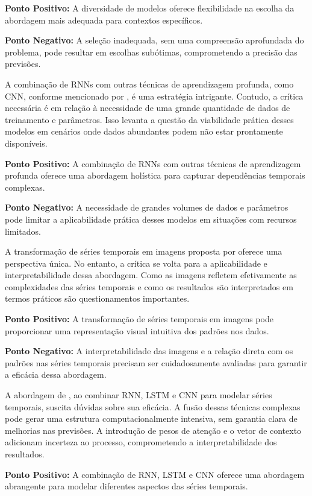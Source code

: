 \textbf{Ponto Positivo:} A diversidade de modelos oferece flexibilidade na escolha da abordagem mais adequada para contextos específicos.

\textbf{Ponto Negativo:} A seleção inadequada, sem uma compreensão aprofundada do problema, pode resultar em escolhas subótimas, comprometendo a precisão das previsões.

A combinação de RNNs com outras técnicas de aprendizagem profunda, como CNN, conforme mencionado por , é uma estratégia intrigante. Contudo, a crítica necessária é em relação à necessidade de uma grande quantidade de dados de treinamento e parâmetros. Isso levanta a questão da viabilidade prática desses modelos em cenários onde dados abundantes podem não estar prontamente disponíveis.

\textbf{Ponto Positivo:} A combinação de RNNs com outras técnicas de aprendizagem profunda oferece uma abordagem holística para capturar dependências temporais complexas.

\textbf{Ponto Negativo:} A necessidade de grandes volumes de dados e parâmetros pode limitar a aplicabilidade prática desses modelos em situações com recursos limitados.

A transformação de séries temporais em imagens proposta por  oferece uma perspectiva única. No entanto, a crítica se volta para a aplicabilidade e interpretabilidade dessa abordagem. Como as imagens refletem efetivamente as complexidades das séries temporais e como os resultados são interpretados em termos práticos são questionamentos importantes.

\textbf{Ponto Positivo:} A transformação de séries temporais em imagens pode proporcionar uma representação visual intuitiva dos padrões nos dados.

\textbf{Ponto Negativo:} A interpretabilidade das imagens e a relação direta com os padrões nas séries temporais precisam ser cuidadosamente avaliadas para garantir a eficácia dessa abordagem.

A abordagem de , ao combinar RNN, LSTM e CNN para modelar séries temporais, suscita dúvidas sobre sua eficácia. A fusão dessas técnicas complexas pode gerar uma estrutura computacionalmente intensiva, sem garantia clara de melhorias nas previsões. A introdução de pesos de atenção e o vetor de contexto adicionam incerteza ao processo, comprometendo a interpretabilidade dos resultados.

\textbf{Ponto Positivo:} A combinação de RNN, LSTM e CNN oferece uma abordagem abrangente para modelar diferentes aspectos das séries temporais.

